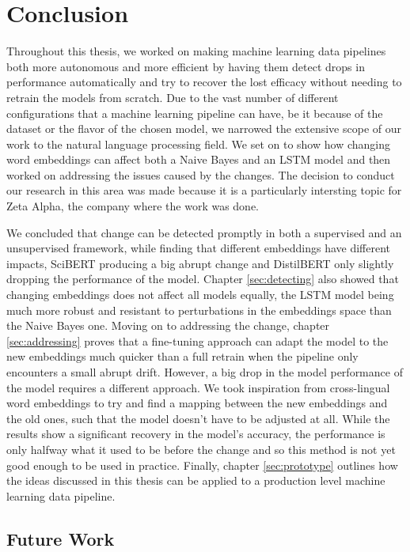 \documentclass[12pt]{extreport}
\begin{document}
\chapter{Conclusion} \label{sec:conclusion}

Throughout this thesis, we worked on making machine learning data pipelines both more autonomous and more efficient by having them detect drops in performance automatically and try to recover the lost efficacy without needing to retrain the models from scratch. Due to the vast number of different configurations that a machine learning pipeline can have, be it because of the dataset or the flavor of the chosen model, we narrowed the extensive scope of our work to the natural language processing field. We set on to show how changing word embeddings can affect both a Naive Bayes and an LSTM model and then worked on addressing the issues caused by the changes. The decision to conduct our research in this area was made because it is a particularly intersting topic  for Zeta Alpha, the company where the work was done.

We concluded that change can be detected promptly in both a supervised and an unsupervised framework, while finding that different embeddings have different impacts, SciBERT producing a big abrupt change and DistilBERT only slightly dropping the performance of the model. Chapter \ref{sec:detecting} also showed that changing embeddings does not affect all models equally, the LSTM model being much more robust and resistant to perturbations in the embeddings space than the Naive Bayes one. Moving on to addressing the change, chapter \ref{sec:addressing} proves that a fine-tuning approach can adapt the model to the new embeddings much quicker than a full retrain when the pipeline only encounters a small abrupt drift. However, a big drop in the model performance of the model requires a different approach. We took inspiration from cross-lingual word embeddings to try and find a mapping between the new embeddings and the old ones, such that the model doesn't have to be adjusted at all. While the results show a significant recovery in the model's accuracy, the performance is only halfway what it used to be before the change and so this method is not yet good enough to be used in practice. Finally, chapter \ref{sec:prototype} outlines how the ideas discussed in this thesis can be applied to a production level machine learning data pipeline.

\section{Future Work}
\end{document}
